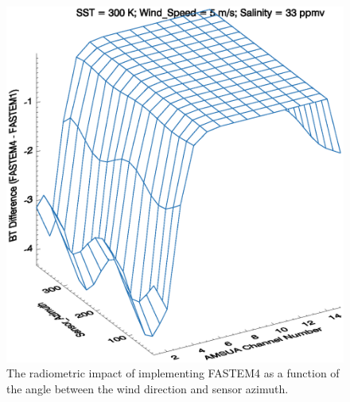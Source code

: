 \begin{figure}[htp]
  \centering
  \includegraphics[scale=0.75]{graphics/AMSUA_Sensor_Azimuth_BT.eps}
  \caption{The radiometric impact of implementing FASTEM4 as a function of the angle between the wind direction and sensor azimuth.}
  \label{fig:AMSUA_Sensor_Azimuth_Impact}
\end{figure} 

%
%



